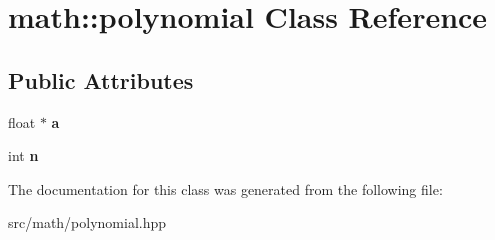 \hypertarget{classmath_1_1polynomial}{
\section{math::polynomial Class Reference}
\label{classmath_1_1polynomial}
}
\subsection*{Public Attributes}
\begin{DoxyCompactItemize}
\item 
\hypertarget{classmath_1_1polynomial_ab2a0a58ff9c7a98300265bce13c88daa}{
float $\ast$ {\bfseries a}}
\label{classmath_1_1polynomial_ab2a0a58ff9c7a98300265bce13c88daa}

\item 
\hypertarget{classmath_1_1polynomial_ad296013c1a1174bb85ee013a1f6139fa}{
int {\bfseries n}}
\label{classmath_1_1polynomial_ad296013c1a1174bb85ee013a1f6139fa}

\end{DoxyCompactItemize}


The documentation for this class was generated from the following file:\begin{DoxyCompactItemize}
\item 
src/math/polynomial.hpp\end{DoxyCompactItemize}
